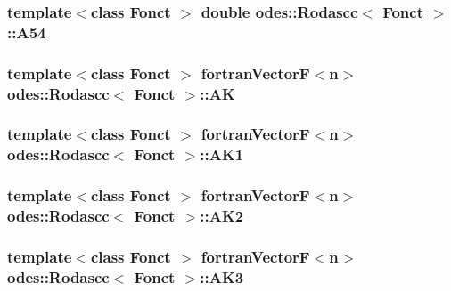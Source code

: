 \hypertarget{classodes_1_1Rodascc_a8a57cb705494dcf4a85d5e5a5c223cdf}{
\subsubsection[{A54}]{\setlength{\rightskip}{0pt plus 5cm}template$<$class Fonct $>$ double {\bf odes\-::\-Rodascc}$<$ Fonct $>$\-::A54\hspace{0.3cm}{\ttfamily [private]}}}\label{classodes_1_1Rodascc_a8a57cb705494dcf4a85d5e5a5c223cdf}
\hypertarget{classodes_1_1Rodascc_a0608e832bc1c7fd4394f9965ac2ef250}{
\subsubsection[{A\-K}]{\setlength{\rightskip}{0pt plus 5cm}template$<$class Fonct $>$ {\bf fortran\-Vector\-F}$<${\bf n}$>$ {\bf odes\-::\-Rodascc}$<$ Fonct $>$\-::A\-K\hspace{0.3cm}{\ttfamily [private]}}}\label{classodes_1_1Rodascc_a0608e832bc1c7fd4394f9965ac2ef250}
\hypertarget{classodes_1_1Rodascc_a02a1f587b9dd6b81978667621e44bc68}{
\subsubsection[{A\-K1}]{\setlength{\rightskip}{0pt plus 5cm}template$<$class Fonct $>$ {\bf fortran\-Vector\-F}$<${\bf n}$>$ {\bf odes\-::\-Rodascc}$<$ Fonct $>$\-::A\-K1\hspace{0.3cm}{\ttfamily [private]}}}\label{classodes_1_1Rodascc_a02a1f587b9dd6b81978667621e44bc68}
\hypertarget{classodes_1_1Rodascc_a22d9a6161a023ffcada131e3e94a33b0}{
\subsubsection[{A\-K2}]{\setlength{\rightskip}{0pt plus 5cm}template$<$class Fonct $>$ {\bf fortran\-Vector\-F}$<${\bf n}$>$ {\bf odes\-::\-Rodascc}$<$ Fonct $>$\-::A\-K2\hspace{0.3cm}{\ttfamily [private]}}}\label{classodes_1_1Rodascc_a22d9a6161a023ffcada131e3e94a33b0}
\hypertarget{classodes_1_1Rodascc_ac9e833c8da9d3a76d8decc0692e358cf}{
\subsubsection[{A\-K3}]{\setlength{\rightskip}{0pt plus 5cm}template$<$class Fonct $>$ {\bf fortran\-Vector\-F}$<${\bf n}$>$ {\bf odes\-::\-Rodascc}$<$ Fonct $>$\-::A\-K3\hspace{0.3cm}{\ttfamily [private]}}}\label{classodes_1_1Rodascc_ac9e833c8da9d3a76d8decc0692e358cf}
